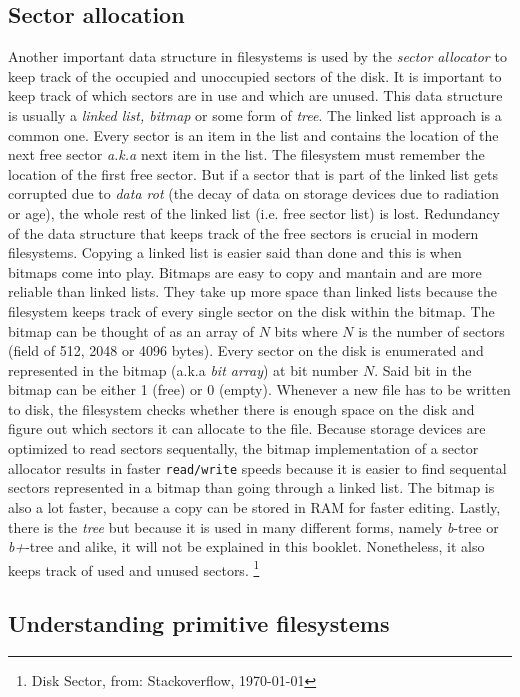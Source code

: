 \subsection{Sector allocation}

Another important data structure in filesystems is used by the \textit{sector allocator} to keep track of the
occupied and unoccupied sectors of the disk. It is important to keep track of which sectors are in use and
which are unused. This data structure is usually a \textit{linked list, bitmap} or some form of \textit{tree}. The
linked list approach is a common one. Every sector is an item in the list and contains the location of
the next free sector \textit{a.k.a} next item in the list. The filesystem must remember the
location of the first free sector. But if a sector that is part of the linked list gets corrupted due
to \textit{data rot} (the decay of data on storage devices due to radiation or age), the whole rest of the
linked list (i.e. free sector list) is lost. Redundancy of the data structure that keeps track of the free sectors is
crucial in modern filesystems. Copying a linked list is easier said than done and this is when bitmaps
come into play. Bitmaps are easy to copy and mantain and are more reliable than linked lists. They
take up more space than linked lists because the filesystem keeps track of every single sector on the
disk within the bitmap. The bitmap can be thought of as an array of $N$ bits where $N$ is the
number of sectors (field of 512, 2048 or 4096 bytes). Every sector on the disk is enumerated and 
represented in the bitmap (a.k.a \textit{bit array}) at bit number $N$. Said bit in the bitmap can be
either 1 (free) or 0 (empty). Whenever a new file has to be written to disk, the filesystem checks
whether there is enough space on the disk and figure out which sectors it can allocate to the file.
Because storage devices are optimized to read sectors sequentally, the bitmap implementation of a
sector allocator results in faster \texttt{read/write} speeds because it is easier to find sequental sectors
represented in a bitmap than going through a linked list. The bitmap is also a lot faster, because a
copy can be stored in RAM for faster editing. Lastly, there is the \textit{tree} but because it is used in
many different forms, namely \textit{b}-tree or \textit{b+}-tree and alike, it will not be explained in this booklet.
Nonetheless, it also keeps track of used and unused sectors. \footnote{Disk Sector, from: Stackoverflow, \today}


\subsection{Understanding primitive filesystems}

